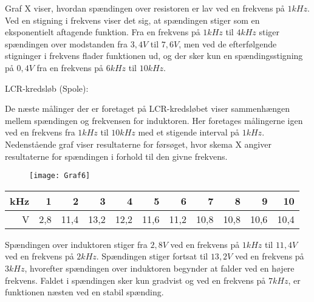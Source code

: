 Graf X viser, hvordan spændingen over resistoren er lav ved en frekvens på $1 kHz$. Ved en stigning i frekvens viser det sig, at spændingen stiger som en eksponentielt aftagende funktion. Fra en frekvens på $1 kHz$ til $4 kHz$ stiger spændingen over modstanden fra $3,4 V$ til $7,6 V$, men ved de efterfølgende stigninger i frekvens flader funktionen ud, og der sker kun en spændingsstigning på $0,4 V$ fra en frekvens på $6 kHz$ til $10 kHz$.

LCR-kredsløb (Spole):

De næste målinger der er foretaget på LCR-kredsløbet viser sammenhængen mellem spændingen og frekvensen for induktoren. Her foretages målingerne igen ved en frekvens fra $1 kHz$ til $10 kHz$ med et stigende interval på $1 kHz$. Nedenstående graf viser resultaterne for førsøget, hvor skema X angiver resultaterne for spændingen i forhold til den givne frekvens.

\begin{figure}[H]
\texttt{[image: Graf6]}
\end{figure}

\begin{tabular}{|r|r|r|r|r|r|r|r|r|r|r|} \hline
kHz & 1 & 2 & 3 & 4 & 5 & 6 & 7 & 8 & 9 & 10 \\ \hline
V & 2,8 & 11,4 & 13,2 & 12,2 & 11,6 & 11,2 & 10,8 & 10,8 & 10,6 & 10,4 \\ \hline
\end{tabular}

Spændingen over induktoren stiger fra $2,8 V$ ved en frekvens på $1 kHz$ til $11,4 V$ ved en frekvens på $2 kHz$. Spændingen stiger fortsat til $13,2 V$ ved en frekvens på $3 kHz$, hvorefter spændingen over induktoren begynder at falder ved en højere frekvens. Faldet i spændingen sker kun gradvist og ved en frekvens på $7 kHz$, er funktionen næsten ved en stabil spænding.